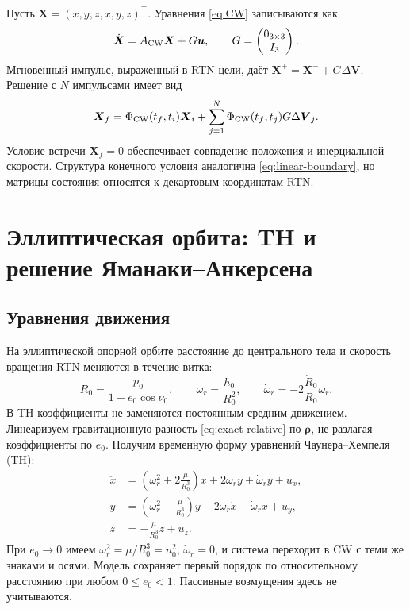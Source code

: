 \documentclass[a4paper,11pt]{article}
\numberwithin{equation}{section}
\theoremstyle{remark}
\newcommand{\vect}[1]{\boldsymbol{#1}}
\begin{document}
Пусть
$\vect X=(x,y,z,\dot x,\dot y,\dot z)^\top$.
Уравнения \eqref{eq:CW} записываются как
\[
 \dot{\vect X}=A_{\rm CW}\vect X+G\vect u,
 \qquad G=\begin{pmatrix}0_{3\times3}\\I_3\end{pmatrix}.
\]
Мгновенный импульс, выраженный в RTN цели, даёт
$\vect X^+=\vect X^-+G\Delta\vect V$.
Решение с $N$ импульсами имеет вид
\begin{equation}
 \vect X_f=\Phi_{\rm CW}(t_f,t_i)\vect X_i
       +\sum_{j=1}^N\Phi_{\rm CW}(t_f,t_j)G\Delta\vect V_j.
 \label{eq:CW-guidance}
\end{equation}
Условие встречи $\vect X_f=0$ обеспечивает совпадение
положения и инерциальной скорости.
Структура конечного условия аналогична \eqref{eq:linear-boundary},
но матрицы состояния относятся к декартовым координатам RTN.

\FloatBarrier
\section{Эллиптическая орбита: TH и решение Яманаки--Анкерсена}
\label{sec:th}

\subsection{Уравнения движения}

На эллиптической опорной орбите расстояние до центрального тела
и скорость вращения RTN меняются в течение витка:
\begin{equation}
 R_0=\frac{p_0}{1+e_0\cos\nu_0},\qquad
 \omega_r=\frac{h_0}{R_0^2},\qquad
 \dot\omega_r=-2\frac{\dot R_0}{R_0}\omega_r.
 \label{eq:ellipse-reference-rates}
\end{equation}
В TH коэффициенты не заменяются постоянным средним движением.
Линеаризуем гравитационную разность
\eqref{eq:exact-relative} по $\vect\rho$, не разлагая
коэффициенты по $e_0$. Получим временную форму
уравнений Чаунера--Хемпеля (TH):
\begin{equation}
 \boxed{\begin{aligned}
 \ddot x&=\left(\omega_r^2+2\frac{\mu}{R_0^3}\right)x
               +2\omega_r\dot y+\dot\omega_r y+u_x,\\
 \ddot y&=\left(\omega_r^2-\frac{\mu}{R_0^3}\right)y
               -2\omega_r\dot x-\dot\omega_r x+u_y,\\
 \ddot z&=-\frac{\mu}{R_0^3}z+u_z.
 \end{aligned}}
 \label{eq:TH-time}
\end{equation}
При $e_0\to0$ имеем
$\omega_r^2=\mu/R_0^3=n_0^2$, $\dot\omega_r=0$,
и система переходит в CW с теми же знаками и осями.
Модель сохраняет первый порядок по относительному расстоянию
при любом $0\le e_0<1$. Пассивные возмущения здесь не учитываются.
\end{document}
